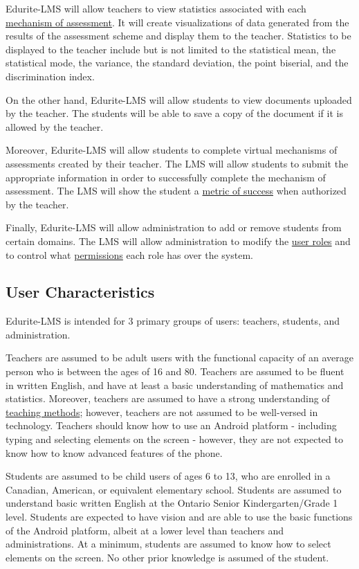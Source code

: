 \documentclass[]{article}
\begin{document}
Edurite-LMS will allow teachers to view statistics associated with each
\underline{mechanism of assessment}. It will create visualizations of data generated from
the results of the assessment scheme and display them to the teacher. Statistics
to be displayed to the teacher include but is not limited to the statistical
mean, the statistical mode, the variance, the standard deviation, the point
biserial, and the discrimination index.

On the other hand, Edurite-LMS will allow students to view documents uploaded by
the teacher. The students will be able to save a copy of the document if it is
allowed by the teacher.

Moreover, Edurite-LMS will allow students to complete virtual mechanisms of
assessments created by their teacher. The LMS will allow students to submit the
appropriate information in order to successfully complete the mechanism of
assessment. The LMS will show the student a \underline{metric of success} when
authorized by the teacher.

Finally, Edurite-LMS will allow administration to add or remove students from
certain domains. The LMS will allow administration to modify the
\underline{user roles} and to control what \underline{permissions} each role has
over the system.

\subsection{User Characteristics}
\label{sub:user_characteristics}
Edurite-LMS is intended for 3 primary groups of users: teachers, students, and
administration.

Teachers are assumed to be adult users with the functional capacity of an
average person who is between the ages of 16 and 80. Teachers are assumed to be
fluent in written English, and have at least a basic understanding of
mathematics and statistics. Moreover, teachers are assumed to have a strong
understanding of \underline{teaching methods}; however, teachers are not assumed to be
well-versed in technology. Teachers should know how to use an Android platform
- including typing and selecting elements on the screen - however, they are not
expected to know how to know advanced features of the phone.

Students are assumed to be child users of ages 6 to 13, who are enrolled in a
Canadian, American, or equivalent elementary school. Students are assumed to
understand basic written English at the Ontario Senior Kindergarten/Grade 1
level. Students are expected to have vision and are able to use the basic
functions of the Android platform, albeit at a lower level than teachers and
administrations. At a minimum, students are assumed to know how to select
elements on the screen. No other prior knowledge is assumed of the student.
\end{document}
